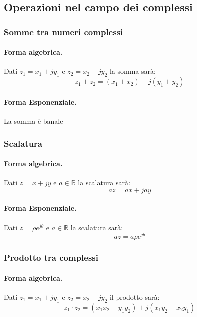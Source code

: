 \subsection{Operazioni nel campo dei complessi}
\subsubsection{Somme tra numeri complessi}
\paragraph{Forma algebrica.} Dati $z_1 = x_1 + jy_1$ e $z_2 = x_2 + jy_2$ la somma sarà:
\begin{equation}
    z_1 + z_2 = (x_1 + x_2) + j(y_1 + y_2)
\end{equation}
\paragraph{Forma Esponenziale.} La somma è banale

\subsubsection{Scalatura}
\paragraph{Forma algebrica.} Dati $z = x + jy$ e $a \in \mathbb{R}$ la scalatura sarà:
\begin{equation}
    az = ax + jay
\end{equation}
\paragraph{Forma Esponenziale.} Dati $z = \rho e^{j\theta}$ e $a \in \mathbb{R}$ la scalatura sarà:
\begin{equation}
    az = a\rho e^{j\theta}
\end{equation}


\subsubsection{Prodotto tra complessi}
\paragraph{Forma algebrica.} Dati $z_1 = x_1 + jy_1$ e $z_2 = x_2 + jy_2$ il prodotto sarà:
\begin{equation}
    z_1 \cdot z_2 = (x_1x_2 + y_1y_2) + j(x_1y_2 + x_2y_1)
\end{equation}
